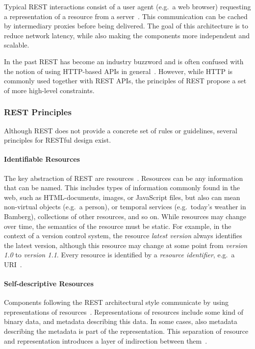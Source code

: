 Typical \ac{REST} interactions consist of a user agent (e.g.\ a web browser) requesting a representation of a resource from a server~\cite{Erenkrantz2007}.
This communication can be cached by intermediary proxies before being delivered.
The goal of this architecture is to reduce network latency, while also making the components more independent and scalable.

In the past \ac{REST} has become an industry buzzword and is often confused with the notion of using \acs{HTTP}-based \acp{API} in general~\cite{Fielding2017}.
However, while \ac{HTTP} is commonly used together with \ac{REST} \acp{API}, the principles of \ac{REST} propose a set of more high-level constraints.

\subsubsection{REST Principles}

Although \ac{REST} does not provide a concrete set of rules or guidelines, several principles for \ac{REST}ful design exist.

\paragraph{Identifiable Resources}

The key abstraction of \ac{REST} are resources~\cite{Fielding2000,Erenkrantz2007}.
Resources can be any information that can be named.
This includes types of information commonly found in the web, such as \acs{HTML}-documents, images, or JavaScript files, but also can mean non-virtual objects (e.g.~a person), or temporal services (e.g.~today's weather in Bamberg), collections of other resources, and so on.
While resources may change over time, the semantics of the resource must be static.
For example, in the context of a version control system, the resource \textit{latest version} always identifies the latest version, although this resource may change at some point from \textit{version 1.0} to \textit{version 1.1}.
Every resource is identified by a \textit{resource identifier}, e.g.~a \ac{URI}~\cite{Caporuscio2011}. 

\paragraph{Self-descriptive Resources}

Components following the \ac{REST} architectural style communicate by using representations of resources~\cite{Fielding2000, Adamczyk2011}.
Representations of resources include some kind of binary data, and metadata describing this data.
In some cases, also metadata describing the metadata is part of the representation.
This separation of resource and representation introduces a layer of indirection between them~\cite{Erenkrantz2007}.

